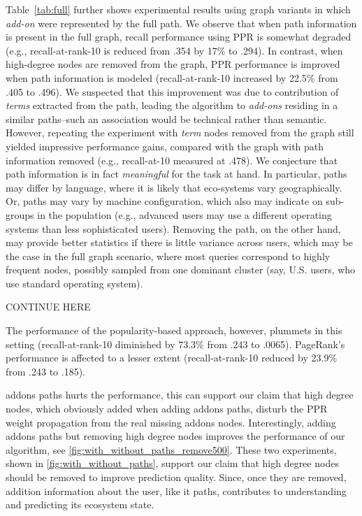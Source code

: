 \documentclass[11pt,oneside]{book}
\begin{document}
Table~\ref{tab:full} further shows experimental results using graph variants in which {\it add-on} were represented by the full path. We observe that when path information is present in the full graph, recall performance using PPR is somewhat degraded (e.g., recall-at-rank-10 is reduced from .354 by 17\% to .294). In contrast, when high-degree nodes are removed from the graph, PPR performance is improved when path information is modeled (recall-at-rank-10 increased by 22.5\% from .405 to .496). We suspected that this improvement was due to contribution of {\it terms} extracted from the path, leading the algorithm to {\it add-ons} residing in a similar paths--such an association would be technical rather than semantic. However, repeating the experiment with {\it term} nodes removed from the graph still yielded impressive performance gains, compared with the graph with path information removed (e.g., recall-at-10 measured at .478). We conjecture that path information is in fact {\it meaningful} for the task at hand. In particular, paths may differ by language, where it is likely that eco-systems vary geographically. Or, paths may vary by machine configuration, which also may indicate on sub-groups in the population (e.g., advanced users may use a different operating systems than less sophisticated users). Removing the path, on the other hand, may provide better statistics if there is little variance across users, which may be the case in the full graph scenario, where most queries correspond to highly frequent nodes, possibly sampled from one dominant cluster (say, U.S. users, who use standard operating system). 

CONTINUE HERE

The performance of the popularity-based approach, however, plummets in this setting (recall-at-rank-10 diminished by 73.3\% from .243 to .0065). PageRank's performance is affected to a lesser extent (recall-at-rank-10 reduced by 23.9\% from .243 to .185). 

addons paths hurts the performance, this can support our claim that
high degree nodes, which obviously added when adding addons paths,
disturb the PPR weight propagation from the real missing addons
nodes. Interestingly, adding addons paths but removing high degree
nodes improves the performance of our algorithm, see
\autoref{fig:with_without_paths_remove500}. These two experiments,
shown in \autoref{fig:with_without_paths}, support our claim that high
degree nodes should be removed to improve prediction quality. Since,
once they are removed, addition information about the user, like it
paths, contributes to understanding and predicting its ecosystem
state.
\end{document}
